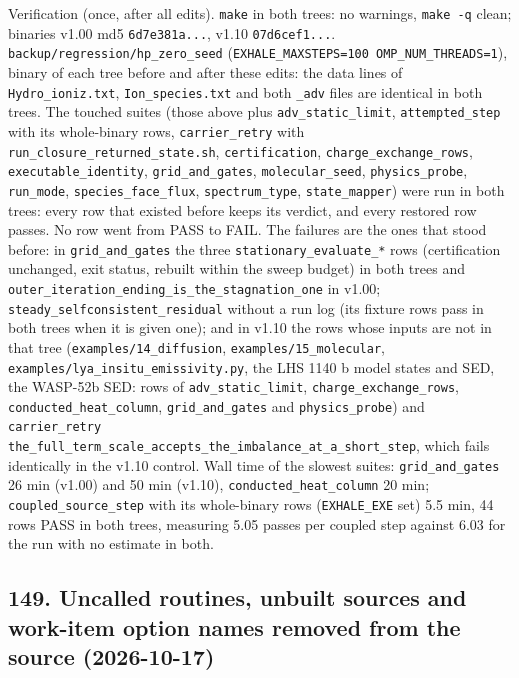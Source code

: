 \documentclass[english,a4paper]{my_memo}
\begin{document}
Verification (once, after all edits). \texttt{make} in both trees: no warnings, \texttt{make\ -q} clean; binaries v1.00 md5 \texttt{6d7e381a...}, v1.10 \texttt{07d6cef1...}. \texttt{backup/regression/hp\_zero\_seed} (\texttt{EXHALE\_MAXSTEPS=100\ OMP\_NUM\_THREADS=1}), binary of each tree before and after these edits: the data lines of \texttt{Hydro\_ioniz.txt}, \texttt{Ion\_species.txt} and both \texttt{\_adv} files are identical in both trees. The touched suites (those above plus \texttt{adv\_static\_limit}, \texttt{attempted\_step} with its whole-binary rows, \texttt{carrier\_retry} with \texttt{run\_closure\_returned\_state.sh}, \texttt{certification}, \texttt{charge\_exchange\_rows}, \texttt{executable\_identity}, \texttt{grid\_and\_gates}, \texttt{molecular\_seed}, \texttt{physics\_probe}, \texttt{run\_mode}, \texttt{species\_face\_flux}, \texttt{spectrum\_type}, \texttt{state\_mapper}) were run in both trees: every row that existed before keeps its verdict, and every restored row passes. No row went from PASS to FAIL. The failures are the ones that stood before: in \texttt{grid\_and\_gates} the three \texttt{stationary\_evaluate\_*} rows (certification unchanged, exit status, rebuilt within the sweep budget) in both trees and \texttt{outer\_iteration\_ending\_is\_the\_stagnation\_one} in v1.00; \texttt{steady\_selfconsistent\_residual} without a run log (its fixture rows pass in both trees when it is given one); and in v1.10 the rows whose inputs are not in that tree (\texttt{examples/14\_diffusion}, \texttt{examples/15\_molecular}, \texttt{examples/lya\_insitu\_emissivity.py}, the LHS 1140 b model states and SED, the WASP-52b SED: rows of \texttt{adv\_static\_limit}, \texttt{charge\_exchange\_rows}, \texttt{conducted\_heat\_column}, \texttt{grid\_and\_gates} and \texttt{physics\_probe}) and \texttt{carrier\_retry} \texttt{the\_full\_term\_scale\_accepts\_the\_imbalance\_at\_a\_short\_step}, which fails identically in the v1.10 control. Wall time of the slowest suites: \texttt{grid\_and\_gates} 26 min (v1.00) and 50 min (v1.10), \texttt{conducted\_heat\_column} 20 min; \texttt{coupled\_source\_step} with its whole-binary rows (\texttt{EXHALE\_EXE} set) 5.5 min, 44 rows PASS in both trees, measuring 5.05 passes per coupled step against 6.03 for the run with no estimate in both.

\subsection{149. Uncalled routines, unbuilt sources and work-item option names removed from the source (2026-10-17)}\label{149-uncalled-routines-unbuilt-sources-and-work-item-option-names-removed-from-the-source-2026-10-17}
\end{document}

